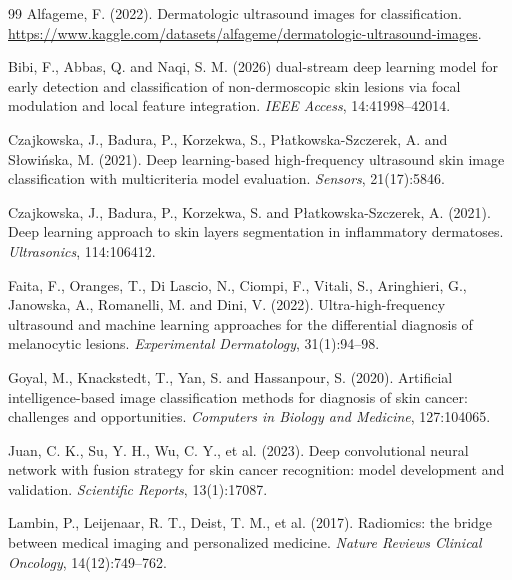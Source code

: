 \documentclass[12pt]{article}
\begin{document}
\begin{thebibliography}{99}
\setlength{\leftmargin}{0.5cm}
\setlength{\itemindent}{-0.5cm}
\setlength{\itemsep}{6pt}
\setlength{\parsep}{0pt}
 Alfageme, F. (2022). Dermatologic ultrasound images for classification. \url{https://www.kaggle.com/datasets/alfageme/dermatologic-ultrasound-images}.

 Bibi, F., Abbas, Q. and Naqi, S. M. (2026) dual-stream deep learning model for early detection and classification of non-dermoscopic skin lesions via focal modulation and local feature integration. \textit{IEEE Access}, 14:41998--42014.

 Czajkowska, J., Badura, P., Korzekwa, S., P{\l}atkowska-Szczerek, A. and S{\l}owi{\'n}ska, M. (2021). Deep learning-based high-frequency ultrasound skin image classification with multicriteria model evaluation. \textit{Sensors}, 21(17):5846.

 Czajkowska, J., Badura, P., Korzekwa, S. and P{\l}atkowska-Szczerek, A. (2021). Deep learning approach to skin layers segmentation in inflammatory dermatoses. \textit{Ultrasonics}, 114:106412.

 Faita, F., Oranges, T., Di Lascio, N., Ciompi, F., Vitali, S., Aringhieri, G., Janowska, A., Romanelli, M. and Dini, V. (2022). Ultra-high-frequency ultrasound and machine learning approaches for the differential diagnosis of melanocytic lesions. \textit{Experimental Dermatology}, 31(1):94--98.

 Goyal, M., Knackstedt, T., Yan, S. and Hassanpour, S. (2020). Artificial intelligence-based image classification methods for diagnosis of skin cancer: challenges and opportunities. \textit{Computers in Biology and Medicine}, 127:104065.

 Juan, C. K., Su, Y. H., Wu, C. Y., et al. (2023). Deep convolutional neural network with fusion strategy for skin cancer recognition: model development and validation. \textit{Scientific Reports}, 13(1):17087.

 Lambin, P., Leijenaar, R. T., Deist, T. M., et al. (2017). Radiomics: the bridge between medical imaging and personalized medicine. \textit{Nature Reviews Clinical Oncology}, 14(12):749--762.


\end{thebibliography}
\end{document}
